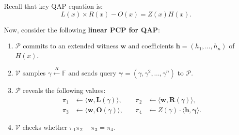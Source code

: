 \documentclass{zkdl-presentation-template}
\begin{document}
    \begin{frame}
        \begin{example}
            Recall that key QAP equation is:
            \begin{equation*}
                L(x) \times R(x) - O(x) = Z(x)H(x).
            \end{equation*}
            
            Now, consider the following \textbf{linear PCP for QAP}:
            \begin{enumerate}
                \item $\mathcal{P}$ commits to an extended witness $\mathbf{w}$ and coefficients $\mathbf{h} = (h_1,\dots,h_n)$ of $H(x)$.
                \item $\mathcal{V}$ samples $\gamma \xleftarrow{R} \mathbb{F}$ and sends query $\boldsymbol{\gamma} = (\gamma,\gamma^2,\dots,\gamma^n)$ to $\mathcal{P}$.
                \item $\mathcal{P}$ reveals the following values:
                \begin{align*}
                    \pi_1 &\gets \langle \mathbf{w}, \boldsymbol{L}(\gamma) \rangle, \quad &\pi_2 &\gets \langle \mathbf{w}, \boldsymbol{R}(\gamma) \rangle, \\ 
                    \pi_3 &\gets \langle \mathbf{w}, \boldsymbol{O}(\gamma) \rangle, \quad &\pi_4 &\gets Z(\gamma) \cdot \langle \mathbf{h}, \boldsymbol{\gamma} \rangle.
                \end{align*}
                \item $\mathcal{V}$ checks whether $\pi_1\pi_2 - \pi_3 = \pi_4$.
            \end{enumerate}
        \end{example}
    \end{frame}
\end{document}
